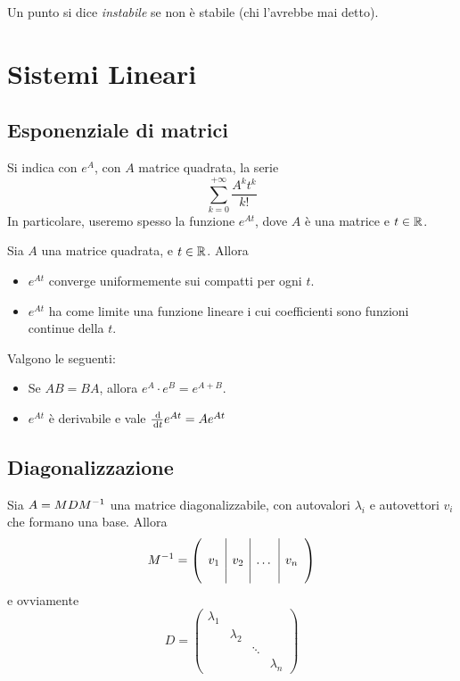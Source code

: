 \documentclass[a4paper,10pt,oneside]{math_article}
\begin{document}
	\begin{mydef}
		Un punto si dice \emph{instabile} se non è stabile (chi l'avrebbe mai detto).
	\end{mydef}




\section{Sistemi Lineari}
	\subsection{Esponenziale di matrici}
	\begin{mydef}
		Si indica con $e^{A}$, con $A$ matrice quadrata, la serie
		\[
			\sum_{k=0}^{+\infty} \frac{A^kt^k}{k!}
		\]
		In particolare, useremo spesso la funzione $e^{At}$, dove $A$ è una matrice e $t\in \mathbb R$.
	\end{mydef}
	
	\begin{mytheorem}
		Sia $A$ una matrice quadrata, e $t \in \mathbb R$. Allora
		\begin{itemize}
		 \item $e^{At}$ converge uniformemente sui compatti per ogni $t$.
		 \item $e^{At}$ ha come limite una funzione lineare i cui coefficienti sono funzioni continue della $t$.
		\end{itemize}

	\end{mytheorem}
	
	\begin{myprop}
		Valgono le seguenti:
		\begin{itemize} 
		 \item Se $AB=BA$, allora $e^A \cdot e^B = e^{A+B}$.
		 \item $e^{At}$ è derivabile e vale $\frac{\, \textrm{d}}{\, \textrm{d} t} e^{At} = Ae^{At}$
		\end{itemize}
	\end{myprop}
	
	
	\subsection{Diagonalizzazione}
		\begin{myprop}
			Sia $A=MDM^{-1}$ una matrice diagonalizzabile, con autovalori $\lambda_i$ e autovettori $v_i$ che formano una base. Allora
			\[
				M^{-1} = \left(
					\begin{array}{c|c|c|c}
						& & & \\
						v_1 & v_2 & \dots & v_n \\
						& & & \\
					\end{array}
				\right)
			\]
			e ovviamente
			\[
				D=\begin{pmatrix}
					\lambda_1 \\
					& \lambda_2 \\
					&& \ddots \\
					&&& \lambda_n
				  \end{pmatrix}
			\]
		\end{myprop}
		
\end{document}
